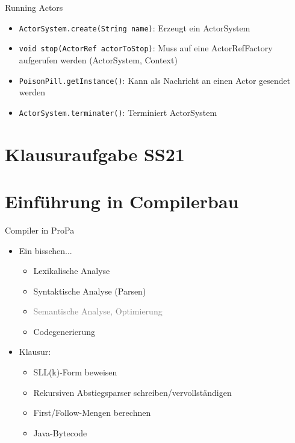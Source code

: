 \documentclass{beamer}
\begin{document}
\begin{frame}{Running Actors}
    \begin{itemize}
        \item \texttt{ActorSystem.create(String name)}: Erzeugt ein ActorSystem
        \item \texttt{void stop(ActorRef actorToStop)}: Muss auf eine ActorRefFactory aufgerufen werden (ActorSystem, Context)
        \item \texttt{PoisonPill.getInstance()}: Kann als Nachricht an einen Actor gesendet werden
        \item \texttt{ActorSystem.terminater()}: Terminiert ActorSystem
    \end{itemize}
\end{frame}

\section{Klausuraufgabe SS21}

\section{Einführung in Compilerbau}

\begin{frame}{Compiler in ProPa}
	\begin{itemize}
		\item Ein bisschen...
		\begin{itemize}
                        \item Lexikalische Analyse
			\item Syntaktische Analyse (Parsen)
			\item \textcolor{gray}{Semantische Analyse, Optimierung}
			\item Codegenerierung
		\end{itemize}
		\pause
		\item Klausur:
		\begin{itemize}
			\item SLL(k)-Form beweisen
			\item Rekursiven Abstiegsparser schreiben/vervollständigen
			\item First/Follow-Mengen berechnen
			\item Java-Bytecode
		\end{itemize}
	\end{itemize}
\end{frame}
\end{document}
